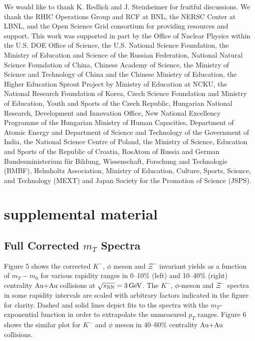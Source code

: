 \documentclass[%
 reprint,	
showpacs,
 amsmath,amssymb,
 aps,
 superscriptaddress,
]{revtex4-1}
\begin{document}

We would like to thank K. Redlich and J. Steinheimer for fruitful discussions.
We thank the RHIC Operations Group and RCF at BNL, the NERSC Center at LBNL, and the Open Science Grid consortium for providing resources and support.  This work was supported in part by the Office of Nuclear Physics within the U.S. DOE Office of Science, the U.S. National Science Foundation, the Ministry of Education and Science of the Russian Federation, National Natural Science Foundation of China, Chinese Academy of Science, the Ministry of Science and Technology of China and the Chinese Ministry of Education, the Higher Education Sprout Project by Ministry of Education at NCKU, the National Research Foundation of Korea, Czech Science Foundation and Ministry of Education, Youth and Sports of the Czech Republic, Hungarian National Research, Development and Innovation Office, New National Excellency Programme of the Hungarian Ministry of Human Capacities, Department of Atomic Energy and Department of Science and Technology of the Government of India, the National Science Centre of Poland, the Ministry  of Science, Education and Sports of the Republic of Croatia, RosAtom of Russia and German Bundesministerium f\"ur Bildung, Wissenschaft, Forschung and Technologie (BMBF), Helmholtz Association, Ministry of Education, Culture, Sports, Science, and Technology (MEXT) and Japan Society for the Promotion of Science (JSPS).




\newpage

\vspace{5.0cm}


\section{supplemental material}

\subsection{Full Corrected $m_T$ Spectra}

Figure 5 shows the corrected $K^-$, $\phi$ meson and $\Xi^-$ invariant yields as a function of $m_T-m_0$ for various rapidity ranges in 0--10\% (left) and 10--40\% (right) centrality Au+Au collisions at ${\sqrt{s_{\rm NN}} = \rm{3\,GeV}}$. The $K^-$, $\phi$-meson and $\Xi^-$ spectra in some rapidity intervals are scaled with arbitrary factors indicated in the figure for clarity. Dashed and solid lines depict fits to the spectra with the $m_T$-exponential function in order to extrapolate the unmeasured $p_T$ ranges. Figure 6 shows the similar plot for $K^-$ and $\phi$ meson in 40--60\% centrality Au+Au collisions.
\end{document}

